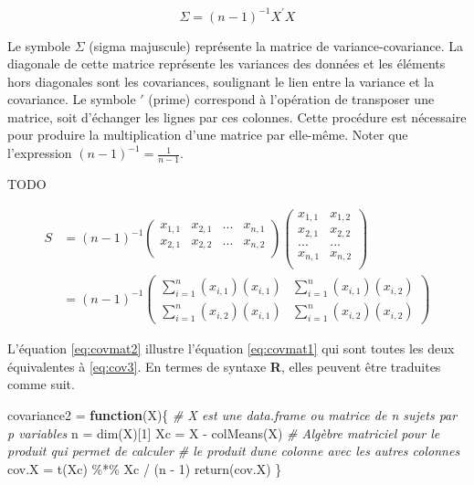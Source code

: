 \documentclass[
]{book}
\newenvironment{Shaded}{}{}
\newcommand{\CommentTok}[1]{\textit{#1}}
\newcommand{\ControlFlowTok}[1]{\textbf{#1}}
\newcommand{\DecValTok}[1]{#1}
\newcommand{\FunctionTok}[1]{#1}
\newcommand{\NormalTok}[1]{#1}
\newcommand{\OtherTok}[1]{#1}
\newcommand{\SpecialCharTok}[1]{#1}
\begin{document}
\begin{equation}
\Sigma = (n-1)^{-1}X^\prime X
\label{eq:covmat1}
\end{equation}

Le symbole \(\Sigma\) (sigma majuscule) représente la matrice de variance-covariance. La diagonale de cette matrice représente les variances des données et les éléments hors diagonales sont les covariances, soulignant le lien entre la variance et la covariance. Le symbole \(\prime\) (prime) correspond à l'opération de transposer une matrice, soit d'échanger les lignes par ces colonnes. Cette procédure est nécessaire pour produire la multiplication d'une matrice par elle-même. Noter que l'expression \((n-1)^{-1}=\frac{1}{n-1}\).

TODO

\begin{equation}
\begin{aligned}
S & = (n-1)^{-1}
\left(\begin{array}{cccc} 
x_{1,1} & x_{2,1} & ... & x_{n,1} \\
x_{2,1} & x_{2,2} & ... & x_{n,2} \\
\end{array}\right) 
\left(\begin{array}{cc} 
x_{1,1} & x_{1,2} \\
x_{2,1} & x_{2,2}\\
... & ...  \\
x_{n,1} & x_{n,2} \\
\end{array}\right) \\
   & = (n-1)^{-1}
\left(\begin{array}{cc}
\sum_{i=1}^n(x_{i,1})(x_{i,1}) & \sum_{i=1}^n(x_{i,1})(x_{i,2})\\
\sum_{i=1}^n(x_{i,2})(x_{i,1}) & \sum_{i=1}^n(x_{i,2})(x_{i,2})
\end{array}\right)
\end{aligned}
\label{eq:covmat2}
\end{equation}

L'équation \eqref{eq:covmat2} illustre l'équation \eqref{eq:covmat1} qui sont toutes les deux équivalentes à \eqref{eq:cov3}. En termes de syntaxe \textbf{R}, elles peuvent être traduites comme suit.

\begin{Shaded}
\begin{Highlighting}[]
\NormalTok{covariance2 }\OtherTok{=} \ControlFlowTok{function}\NormalTok{(X)\{}
  \CommentTok{\# X est une data.frame ou matrice de n sujets par p variables}
\NormalTok{  n }\OtherTok{=} \FunctionTok{dim}\NormalTok{(X)[}\DecValTok{1}\NormalTok{]}
\NormalTok{  Xc }\OtherTok{=}\NormalTok{ X }\SpecialCharTok{{-}} \FunctionTok{colMeans}\NormalTok{(X)}
  \CommentTok{\# Algèbre matriciel pour le produit qui permet de calculer}
  \CommentTok{\# le produit d\textquotesingle{}une colonne avec les autres colonnes}
\NormalTok{  cov.X }\OtherTok{=} \FunctionTok{t}\NormalTok{(Xc) }\SpecialCharTok{\%*\%}\NormalTok{ Xc }\SpecialCharTok{/}\NormalTok{ (n }\SpecialCharTok{{-}} \DecValTok{1}\NormalTok{)}
  \FunctionTok{return}\NormalTok{(cov.X)}
\NormalTok{\}}
\end{Highlighting}
\end{Shaded}
\end{document}
